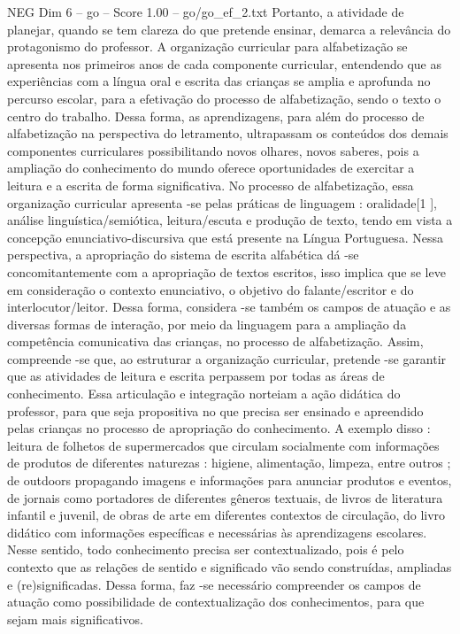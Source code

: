 \begin{textsample}{NEG Dim 6 – go – Score 1.00 – go/go\_ef\_2.txt}
Portanto, a atividade de planejar, quando se tem clareza do que pretende ensinar, demarca a relevância do protagonismo do professor.
A organização curricular para alfabetização se apresenta nos primeiros anos de cada componente curricular, entendendo que as experiências com a língua oral e escrita das crianças se amplia e aprofunda no percurso escolar, para a efetivação do processo de alfabetização, sendo o texto o centro do trabalho.
Dessa forma, as aprendizagens, para além do processo de alfabetização na perspectiva do letramento, ultrapassam os conteúdos dos demais componentes curriculares possibilitando novos olhares, novos saberes, pois a ampliação do conhecimento do mundo oferece oportunidades de exercitar a leitura e a escrita de forma significativa.
No processo de alfabetização, essa organização curricular apresenta -se pelas práticas de linguagem : oralidade[1 ], análise linguística/semiótica, leitura/escuta e produção de texto, tendo em vista a concepção enunciativo-discursiva que está presente na Língua Portuguesa.
Nessa perspectiva, a apropriação do sistema de escrita alfabética dá -se concomitantemente com a apropriação de textos escritos, isso implica que se leve em consideração o contexto enunciativo, o objetivo do falante/escritor e do interlocutor/leitor.
Dessa forma, considera -se também os campos de atuação e as diversas formas de interação, por meio da linguagem para a ampliação da competência comunicativa das crianças, no processo de alfabetização.
Assim, compreende -se que, ao estruturar a organização curricular, pretende -se garantir que as atividades de leitura e escrita perpassem por todas as áreas de conhecimento.
Essa articulação e integração norteiam a ação didática do professor, para que seja propositiva no que precisa ser ensinado e apreendido pelas crianças no processo de apropriação do conhecimento.
A exemplo disso : leitura de folhetos de supermercados que circulam socialmente com informações de produtos de diferentes naturezas : higiene, alimentação, limpeza, entre outros ; de outdoors propagando imagens e informações para anunciar produtos e eventos, de jornais como portadores de diferentes gêneros textuais, de livros de literatura infantil e juvenil, de obras de arte em diferentes contextos de circulação, do livro didático com informações específicas e necessárias às aprendizagens escolares.
Nesse sentido, todo conhecimento precisa ser contextualizado, pois é pelo contexto que as relações de sentido e significado vão sendo construídas, ampliadas e (re)significadas.
Dessa forma, faz -se necessário compreender os campos de atuação como possibilidade de contextualização dos conhecimentos, para que sejam mais significativos.

\end{textsample}
